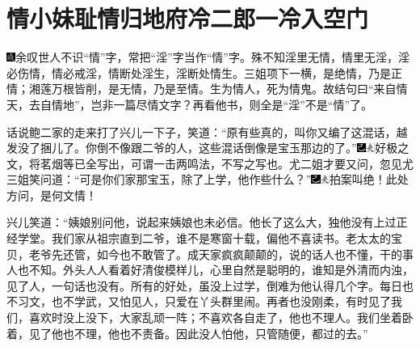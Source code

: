 
\chapter{情小妹耻情归地府\hspace{.5em}冷二郎一冷入空门}

{\includegraphics[width=3mm]{../Images/00005}\kaishu 余叹世人不识“情”字，常把“淫”字当作“情”字。殊不知淫里无情，情里无淫，淫必伤情，情必戒淫，情断处淫生，淫断处情生。三姐项下一横，是绝情，乃是正情；湘莲万根皆削，是无情，乃是至情。生为情人，死为情鬼。故结句曰“来自情天，去自情地”，岂非一篇尽情文字？再看他书，则全是“淫”不是“情”了。}

话说鲍二家的走来打了兴儿一下子，笑道：“原有些真的，叫你又编了这混话，越发没了捆儿了。你倒不像跟二爷的人，这些混话倒像是宝玉那边的了。”{\includegraphics[width=3mm]{../Images/00003}\includegraphics[width=3mm]{../Images/00012}\footnotesize \kaishu 好极之文，将茗烟等已全写出，可谓一击两鸣法，不写之写也。}尤二姐才要又问，忽见尤三姐笑问道：“可是你们家那宝玉，除了上学，他作些什么？”{\includegraphics[width=3mm]{../Images/00003}\includegraphics[width=3mm]{../Images/00012}\footnotesize \kaishu 拍案叫绝！此处方问，是何文情！}

兴儿笑道：“姨娘别问他，说起来姨娘也未必信。他长了这么大，独他没有上过正经学堂。我们家从祖宗直到二爷，谁不是寒窗十载，偏他不喜读书。老太太的宝贝，老爷先还管，如今也不敢管了。成天家疯疯颠颠的，说的话人也不懂，干的事人也不知。外头人人看着好清俊模样儿，心里自然是聪明的，谁知是外清而内浊，见了人，一句话也没有。所有的好处，虽没上过学，倒难为他认得几个字。每日也不习文，也不学武，又怕见人，只爱在丫头群里闹。再者也没刚柔，有时见了我们，喜欢时没上没下，大家乱顽一阵；不喜欢各自走了，他也不理人。我们坐着卧着，见了他也不理，他也不责备。因此没人怕他，只管随便，都过的去。”

